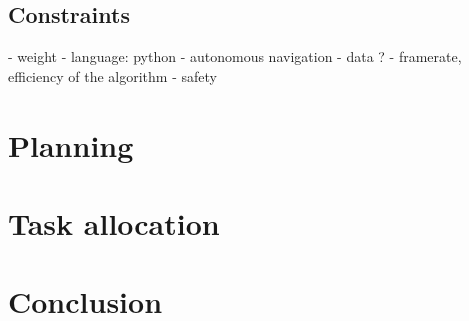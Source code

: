 \documentclass{article}
\begin{document}
\subsection{Constraints}
- weight
- language: python
- autonomous navigation
- data ?
- framerate, efficiency of the algorithm
- safety

\section {Planning}

\section {Task allocation}

\section {Conclusion}
\end{document}
